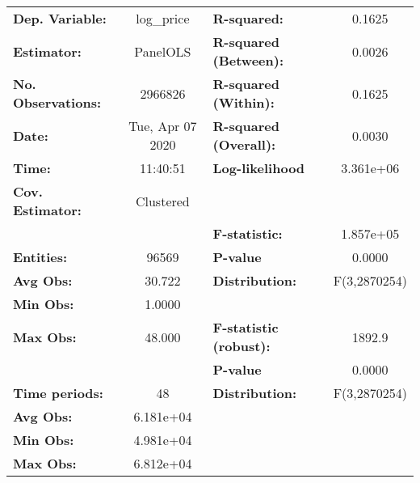 \documentclass{report}
\begin{document}
\begin{center}
\begin{tabular}{lclc}
\toprule
\textbf{Dep. Variable:}      &     log\_price     & \textbf{  R-squared:         }   &      0.1625      \\
\textbf{Estimator:}          &      PanelOLS      & \textbf{  R-squared (Between):}  &      0.0026      \\
\textbf{No. Observations:}   &      2966826       & \textbf{  R-squared (Within):}   &      0.1625      \\
\textbf{Date:}               &  Tue, Apr 07 2020  & \textbf{  R-squared (Overall):}  &      0.0030      \\
\textbf{Time:}               &      11:40:51      & \textbf{  Log-likelihood     }   &    3.361e+06     \\
\textbf{Cov. Estimator:}     &     Clustered      & \textbf{                     }   &                  \\
\textbf{}                    &                    & \textbf{  F-statistic:       }   &    1.857e+05     \\
\textbf{Entities:}           &       96569        & \textbf{  P-value            }   &      0.0000      \\
\textbf{Avg Obs:}            &       30.722       & \textbf{  Distribution:      }   &   F(3,2870254)   \\
\textbf{Min Obs:}            &       1.0000       & \textbf{                     }   &                  \\
\textbf{Max Obs:}            &       48.000       & \textbf{  F-statistic (robust):} &      1892.9      \\
\textbf{}                    &                    & \textbf{  P-value            }   &      0.0000      \\
\textbf{Time periods:}       &         48         & \textbf{  Distribution:      }   &   F(3,2870254)   \\
\textbf{Avg Obs:}            &     6.181e+04      & \textbf{                     }   &                  \\
\textbf{Min Obs:}            &     4.981e+04      & \textbf{                     }   &                  \\
\textbf{Max Obs:}            &     6.812e+04      & \textbf{                     }   &                  \\
\bottomrule
\end{tabular}
\begin{tabular}{lcccccc}

\end{tabular}
\end{center}
\end{document}
